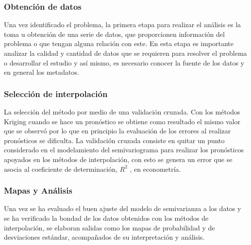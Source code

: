 \subsubsection{Obtención de datos}
Una vez identificado el problema, la primera etapa para realizar el análisis es la toma u
obtención de una serie de datos, que proporcionen información del problema o que tengan
alguna relación con este. En esta etapa es importante analizar la calidad y cantidad de datos
que se requieren para resolver el problema o desarrollar el estudio y así mismo, es necesario
conocer la fuente de los datos y en general los metadatos. 









\subsubsection{Selección de interpolación}
La selección del
método por medio de una validación cruzada. Con los métodos Kriging cuando se hace un pronóstico se obtiene como resultado el mismo
valor que se observó por lo que en principio la evaluación de los errores al realizar
pronósticos se dificulta.
La validación cruzada consiste en quitar un punto considerado en el modelamiento del
semivariograma para realizar los pronósticos apoyados en los métodos de interpolación,
con esto se genera un error que se asocia al coeficiente de determinación, $R^2$ , en
econometría. 

\subsubsection{Mapas y Análisis}

Una vez se ha evaluado el buen ajuste del modelo de semivarianza a los datos y se ha
verificado la bondad de los datos obtenidos con los métodos de interpolación, se elaboran salidas como los mapas de probabilidad y de desviaciones estándar, acompañados de su interpretación y análisis.





